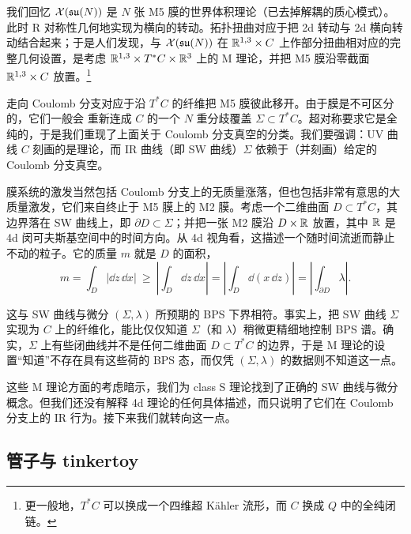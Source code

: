  我们回忆 $\mathcal{X}(\mathfrak{su}(N))$ 是 $N$ 张 M5 膜的世界体积理论（已去掉解耦的质心模式）。此时 R 对称性几何地实现为横向的转动。拓扑扭曲对应于把 2d 转动与 2d 横向转动结合起来；于是人们发现，与 $\mathcal{X}(\mathfrak{su}(N))$ 在 $\mathbb{R}^{1,3}\times C$ 上作部分扭曲相对应的完整几何设置，是考虑 $\mathbb{R}^{1,3}\times T^*C\times\mathbb{R}^3$ 上的 M 理论，并把 M5 膜沿零截面 $\mathbb{R}^{1,3}\times C$ 放置。\footnote{更一般地，$T^*C$ 可以换成一个四维超 Kähler 流形，而 $C$ 换成 $Q$ 中的全纯闭链。}

走向 Coulomb 分支对应于沿 $T^*C$ 的纤维把 M5 膜彼此移开。由于膜是不可区分的，它们一般会
重新连成 $C$ 的一个 $N$ 重分歧覆盖 $\Sigma\subset T^*C$。超对称要求它是全纯的，于是我们重现了上面关于 Coulomb 分支真空的分类。我们要强调：UV 曲线 $C$ 刻画的是理论，而 IR 曲线（即 SW 曲线）$\Sigma$ 依赖于（并刻画）给定的 Coulomb 分支真空。

膜系统的激发当然包括 Coulomb 分支上的无质量涨落，但也包括非常有意思的大质量激发，它们来自终止于 M5 膜上的 M2 膜。考虑一个二维曲面 $D\subset T^*C$，其边界落在 SW 曲线上，即 $\partial D\subset\Sigma$；并把一张 M2 膜沿 $D\times\mathbb{R}$ 放置，其中 $\mathbb{R}$ 是 4d 闵可夫斯基空间中的时间方向。从 4d 视角看，这描述一个随时间流逝而静止不动的粒子。它的质量 $m$ 就是 $D$ 的面积，
\begin{equation}
  m=\int_D\left|\dd z\,\dd x\right|
  \ \ge\ \left|\int_D \dd z\,\dd x\right|
  =\left|\int_D \dd(x\,\dd z)\right|
  =\left|\int_{\partial D}\lambda\right|.
  \tag{3.16}
\end{equation}


这与 SW 曲线与微分 $(\Sigma,\lambda)$ 所预期的 BPS 下界相符。事实上，把 SW 曲线 $\Sigma$ 实现为 $C$ 上的纤维化，能比仅仅知道 $\Sigma$（和 $\lambda$）稍微更精细地控制 BPS 谱。确实，$\Sigma$ 上有些闭曲线并不是任何二维曲面 $D\subset T^*C$ 的边界，于是 M 理论的设置“知道”不存在具有这些荷的 BPS 态，而仅凭 $(\Sigma,\lambda)$ 的数据则不知道这一点。

这些 M 理论方面的考虑暗示，我们为 class S 理论找到了正确的 SW 曲线与微分概念。但我们还没有解释 4d 理论的任何具体描述，而只说明了它们在 Coulomb 分支上的 IR 行为。接下来我们就转向这一点。

\subsection{管子与 tinkertoy}

